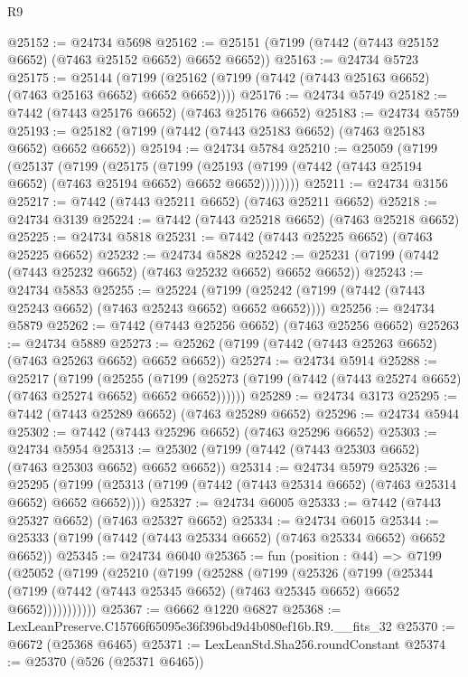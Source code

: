 \begin{lexlean}{R9}
\begin{coremodule}
@25152 := @24734 @5698
@25162 := @25151 (@7199 (@7442 (@7443 @25152 @6652) (@7463 @25152 @6652) @6652 @6652))
@25163 := @24734 @5723
@25175 := @25144
    (@7199 (@25162 (@7199 (@7442 (@7443 @25163 @6652) (@7463 @25163 @6652) @6652 @6652))))
@25176 := @24734 @5749
@25182 := @7442 (@7443 @25176 @6652) (@7463 @25176 @6652)
@25183 := @24734 @5759
@25193 := @25182 (@7199 (@7442 (@7443 @25183 @6652) (@7463 @25183 @6652) @6652 @6652))
@25194 := @24734 @5784
@25210 := @25059
    (@7199
      (@25137
        (@7199
          (@25175
            (@7199
              (@25193 (@7199 (@7442 (@7443 @25194 @6652) (@7463 @25194 @6652) @6652 @6652))))))))
@25211 := @24734 @3156
@25217 := @7442 (@7443 @25211 @6652) (@7463 @25211 @6652)
@25218 := @24734 @3139
@25224 := @7442 (@7443 @25218 @6652) (@7463 @25218 @6652)
@25225 := @24734 @5818
@25231 := @7442 (@7443 @25225 @6652) (@7463 @25225 @6652)
@25232 := @24734 @5828
@25242 := @25231 (@7199 (@7442 (@7443 @25232 @6652) (@7463 @25232 @6652) @6652 @6652))
@25243 := @24734 @5853
@25255 := @25224
    (@7199 (@25242 (@7199 (@7442 (@7443 @25243 @6652) (@7463 @25243 @6652) @6652 @6652))))
@25256 := @24734 @5879
@25262 := @7442 (@7443 @25256 @6652) (@7463 @25256 @6652)
@25263 := @24734 @5889
@25273 := @25262 (@7199 (@7442 (@7443 @25263 @6652) (@7463 @25263 @6652) @6652 @6652))
@25274 := @24734 @5914
@25288 := @25217
    (@7199
      (@25255
        (@7199 (@25273 (@7199 (@7442 (@7443 @25274 @6652) (@7463 @25274 @6652) @6652 @6652))))))
@25289 := @24734 @3173
@25295 := @7442 (@7443 @25289 @6652) (@7463 @25289 @6652)
@25296 := @24734 @5944
@25302 := @7442 (@7443 @25296 @6652) (@7463 @25296 @6652)
@25303 := @24734 @5954
@25313 := @25302 (@7199 (@7442 (@7443 @25303 @6652) (@7463 @25303 @6652) @6652 @6652))
@25314 := @24734 @5979
@25326 := @25295
    (@7199 (@25313 (@7199 (@7442 (@7443 @25314 @6652) (@7463 @25314 @6652) @6652 @6652))))
@25327 := @24734 @6005
@25333 := @7442 (@7443 @25327 @6652) (@7463 @25327 @6652)
@25334 := @24734 @6015
@25344 := @25333 (@7199 (@7442 (@7443 @25334 @6652) (@7463 @25334 @6652) @6652 @6652))
@25345 := @24734 @6040
@25365 := fun (position : @44) =>
  @7199
    (@25052
      (@7199
        (@25210
          (@7199
            (@25288
              (@7199
                (@25326
                  (@7199
                    (@25344
                      (@7199 (@7442 (@7443 @25345 @6652) (@7463 @25345 @6652) @6652 @6652)))))))))))
@25367 := @6662 @1220 @6827
@25368 := LexLeanPreserve.C15766f65095e36f396bd9d4b080ef16b.R9.__fits_32
@25370 := @6672 (@25368 @6465)
@25371 := LexLeanStd.Sha256.roundConstant
@25374 := @25370 (@526 (@25371 @6465))

\end{coremodule}
\end{lexlean}
